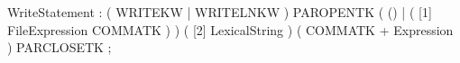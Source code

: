 %
%
%
\begin{rail}
WriteStatement : ( WRITEKW | WRITELNKW )
                 PAROPENTK ( () | ( [1] FileExpression COMMATK ) )
                 ( [2] LexicalString ) ( COMMATK + Expression ) PARCLOSETK
               ;
\end{rail}
